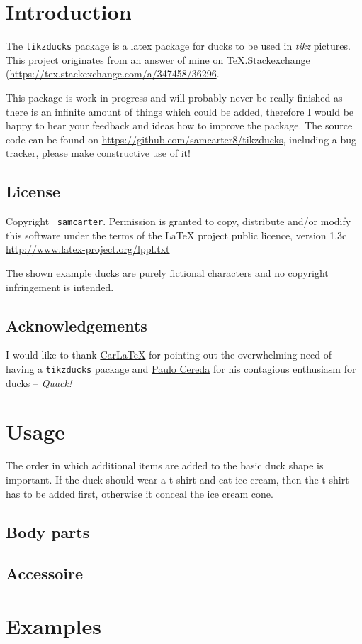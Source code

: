 \documentclass{ltxdockit}
\newcommand{\tikzducks}{\texttt{tikzducks}\xspace}
\begin{document}
\printtitlepage

\section{Introduction}
\label{intro}

The \tikzducks package is a latex package for ducks to be used in \emph{tikz} pictures. This project originates from an answer of mine on TeX.Stackexchange (\url{https://tex.stackexchange.com/a/347458/36296}.

This package is work in progress and will probably never be really finished as there is an infinite amount of things which could be added, therefore I would be happy to hear your feedback and ideas how to improve the package. The source code can be found on \url{https://github.com/samcarter8/tikzducks}, including a bug tracker, please make constructive use of it!

\subsection{License}

Copyright \textcopyright\ \texttt{samcarter}. Permission is granted to copy, distribute and\slash or modify this software under the terms of the LaTeX project public licence, version 1.3c \url{http://www.latex-project.org/lppl.txt}

The shown example ducks are purely fictional characters and no copyright infringement is intended.

\subsection{Acknowledgements}

I would like to thank \href{https://tex.stackexchange.com/users/101651/carlatex}{CarLaTeX} for pointing out the overwhelming need of having a \tikzducks package and \href{https://tex.stackexchange.com/users/3094/paulo-cereda}{Paulo Cereda} for his contagious enthusiasm for ducks -- \emph{Quack!}

\section{Usage}

The order in which additional items are added to the basic duck shape is important. If the duck should wear a t-shirt and eat ice cream, then the t-shirt has to be added first, otherwise it conceal the ice cream cone.
 
\subsection{Body parts}

\subsection{Accessoire}

\section{Examples}
\end{document}
